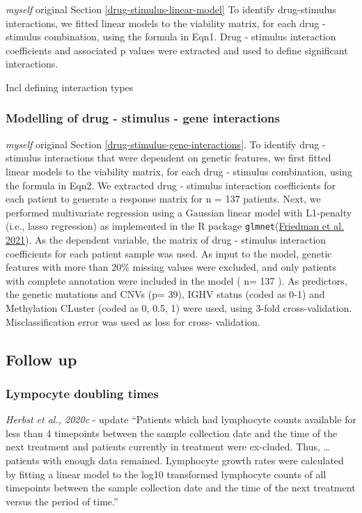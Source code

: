 \documentclass[11pt, a4paper, twosided]{book}
\begin{document}
\emph{myself} original
Section \ref{drug-stimulus-linear-model} To identify drug-stimulus interactions, we fitted linear models to the viability matrix, for each drug - stimulus combination, using the formula in Eqn1. Drug - stimulus interaction coefficients and associated p values were extracted and used to define significant interactions.

Incl defining interaction types

\hypertarget{drug-stimulus-gene-interactions-method}{%
\subsubsection{Modelling of drug - stimulus - gene interactions}\label{drug-stimulus-gene-interactions-method}}

\emph{myself} original
Section \ref{drug-stimulus-gene-interactions}. To identify drug - stimulus interactions that were dependent on genetic features, we first fitted linear models to the viability matrix, for each drug - stimulus combination, using the formula in Eqn2. We extracted drug - stimulus interaction coefficients for each patient to generate a response matrix for n = 137 patients. Next, we performed multivariate regression using a Gaussian linear model with L1-penalty (i.e., lasso regression) as implemented in the R package \texttt{glmnet}(\protect\hyperlink{ref-R-glmnet}{Friedman et al. 2021}). As the dependent variable, the matrix of drug - stimulus interaction coefficients for each patient sample was used. As input to the model, genetic features with more than 20\% missing values were excluded, and only patients with complete annotation were included in the model ( n= 137 ). As predictors, the genetic mutations and CNVs (p= 39), IGHV status (coded as 0-1) and Methylation CLuster (coded as 0, 0.5, 1) were used, using 3-fold cross-validation. Misclassification error was used as loss for cross- validation.

\hypertarget{follow-up}{%
\subsection{Follow up}\label{follow-up}}

\hypertarget{lympocyte-doubling-times}{%
\subsubsection{Lympocyte doubling times}\label{lympocyte-doubling-times}}

\emph{Herbst et al., 2020c} - update
``Patients which had lymphocyte counts available for less than 4 timepoints between the sample
collection date and the time of the next treatment and patients currently in treatment were ex-cluded. Thus, \ldots{} patients with enough data remained. Lymphocyte growth rates were calculated by fitting a linear model to the log10 transformed lymphocyte counts of all timepoints between the sample collection date and the time of the next treatment versus the period of time.''
\end{document}
